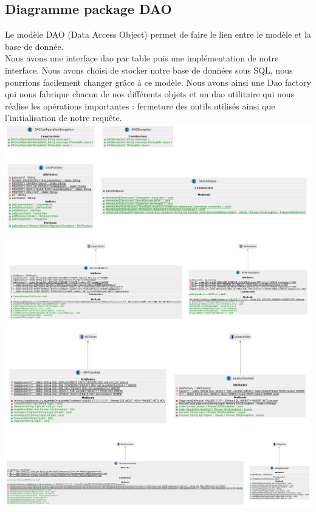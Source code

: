         \subsection{Diagramme package DAO}
            Le modèle DAO (Data Access Object) permet de faire le lien entre le modèle et la base de donnée. \\
            Nous avons une interface dao par table puis une implémentation de notre interface. Nous avons choisi de stocker notre base de données sous SQL, nous pourrions facilement changer grâce à ce modèle. Nous avons ainsi une Dao factory qui nous fabrique chacun de nos différents objets et un dao utilitaire qui nous réalise les opérations importantes : fermeture des outils utilisés ainsi que l'initialisation de notre requête. \\
            \includegraphics[scale=0.4]{ressources/images/Classesdao1.png} \\
            \includegraphics[scale=0.3]{ressources/images/Classesdao2.png} \\
            \includegraphics[scale=0.4]{ressources/images/Classesdao3.png} \\
            \includegraphics[scale=0.25]{ressources/images/Classesdao4.png} \\
